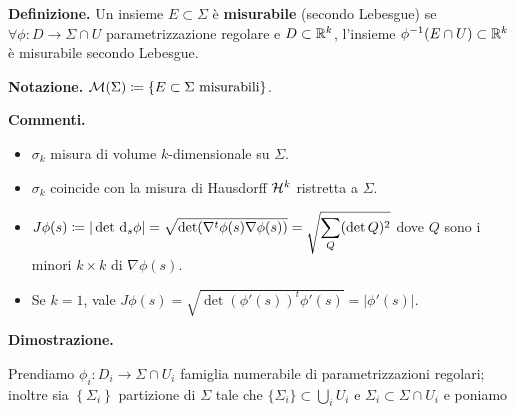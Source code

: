 
\vss

\textbf{Definizione.} Un insieme $E \subset \Sigma$ è \textbf{misurabile} (secondo Lebesgue) se $\forall \phi \colon D \to \Sigma \cap U$ parametrizzazione regolare e $D \subset \mathbb R^k$, l'insieme $\phi^{-1}(E \cap U) \subset \mathbb R^k$ è misurabile secondo Lebesgue.

\textbf{Notazione.} $\mathcal{M}(\Sigma) \coloneqq  \{ E \subset \Sigma \text{ misurabili} \}$.


\textbf{Commenti.} 
\begin{itemize}

	\item $\sigma_k$ misura di volume $k$-dimensionale su $\Sigma$.

	\item $\sigma_k$ coincide con la misura di Hausdorff $\mathcal{H}^k$ ristretta a $\Sigma$.

	\item $\displaystyle J\phi (s) \coloneqq |\det \,\mathrm{d}_s \phi| = \sqrt{\det (\nabla^t \phi(s) \nabla \phi(s))} = \sqrt{\sum_Q (\det Q)^2} $ dove $Q$ sono i minori $k \times k$ di $\nabla \phi(s)$.

	\item Se $k = 1$, vale $J\phi(s) = \sqrt{\det(\phi'(s))^t \phi'(s)} = |\phi'(s)| $.

\end{itemize}


\textbf{Dimostrazione.} 

Prendiamo $\phi_i \colon  D_i \to \Sigma \cap U_i$ famiglia numerabile di parametrizzazioni regolari; inoltre sia $\left\{ \Sigma_i \right\}$ partizione di $\Sigma$ tale che $\{\Sigma_i\} \subset \bigcup_i U_i$ e $\Sigma_i \subset \Sigma \cap U_i$ e poniamo

